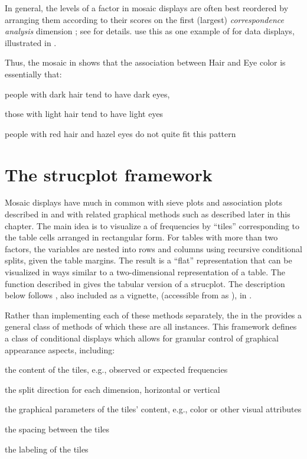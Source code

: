 \documentclass[11pt]{book}
\begin{document}
In general, the levels of a factor in mosaic displays
are often best reordered by
arranging them according to their scores on the first (largest)
\emph{correspondence analysis} dimension \citep{Friendly:94a};
see  for details.
\citet{FriendlyKwan:02:effect} use this as one example of
 for data displays, illustrated in .

Thus, the mosaic in  shows that the association between Hair and Eye color
is essentially that: 
\begin{itemize*}
\item people with dark hair tend to have dark eyes,
\item those with light hair tend to have light eyes
\item people with red hair and hazel eyes do not quite fit this pattern
\end{itemize*}

\section{The strucplot framework}\label{sec:mosaic-strucplot}
Mosaic displays have much in common with sieve plots and association plots
described in  and with related graphical methods
such as  described later in this chapter.
The main idea is to visualize a \ctab of frequencies by ``tiles'' corresponding
to the table cells arranged in rectangular form. 
For \mway tables with more than two factors,
the variables are nested into rows and columns using recursive
conditional splits, given the table margins. The result is a
``flat'' representation that can be visualized in
ways similar to a two-dimensional representation of a table. 
The  function described in  gives the tabular
version of a strucplot.  The description below follows \citet{MeyerZeileisHornik:2006}, also
included as a vignette, 
(accessible from \R as ), in .

Rather than implementing each of these methods separately, the
 in the  provides a 
general class of methods of which these are all instances.
This framework defines a class of conditional displays which allows
for granular control of graphical appearance aspects, including:

\begin{itemize*}
\item the content of the tiles, e.g., observed or expected frequencies
\item the split direction for each dimension, horizontal or vertical
\item the graphical parameters of the tiles' content, e.g., color or other visual attributes
\item the spacing between the tiles
\item the labeling of the tiles
\end{itemize*}
\end{document}
